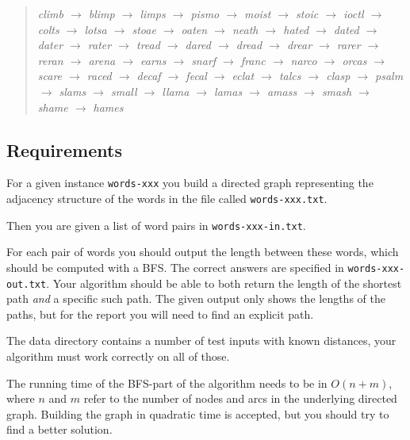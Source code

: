 \documentclass{tufte-handout}
\begin{document}
\begin{fullwidth}
\begin{quotation}\em
climb $\rightarrow$ blimp $\rightarrow$ limps $\rightarrow$ pismo $\rightarrow$ moist $\rightarrow$ stoic $\rightarrow$ ioctl $\rightarrow$ colts $\rightarrow$ lotsa $\rightarrow$ stoae $\rightarrow$ oaten $\rightarrow$ neath $\rightarrow$ hated $\rightarrow$ dated $\rightarrow$ dater $\rightarrow$ rater $\rightarrow$ tread $\rightarrow$ dared $\rightarrow$ dread $\rightarrow$ drear $\rightarrow$ rarer $\rightarrow$ reran $\rightarrow$ arena $\rightarrow$ earns $\rightarrow$ snarf $\rightarrow$ franc $\rightarrow$ narco $\rightarrow$ orcas $\rightarrow$ scare $\rightarrow$ raced $\rightarrow$ decaf $\rightarrow$ fecal $\rightarrow$ eclat $\rightarrow$ talcs $\rightarrow$ clasp $\rightarrow$ psalm $\rightarrow$ slams $\rightarrow$ small $\rightarrow$ llama $\rightarrow$ lamas $\rightarrow$ amass $\rightarrow$ smash $\rightarrow$ shame $\rightarrow$ hames
\end{quotation}
\end{fullwidth}

\newpage
\subsection{Requirements}

For a given instance {\tt words-xxx} you build a directed graph representing the adjacency structure of the words in the file called {\tt words-xxx.txt}. 

Then you are given a list of word pairs in {\tt words-xxx-in.txt}.

For each pair of words you should output the length between these words, which should be computed with a BFS. The correct answers are specified in {\tt words-xxx-out.txt}.
Your algorithm should be able to both return the length of the shortest path \emph{and} a specific such path. The given output only shows the lengths of the paths, but for the report you will need to find an explicit path.

The data directory contains a number of test inputs with known distances, your algorithm must work correctly on all of those.

The running time of the BFS-part of the algorithm needs to be in $O(n+m)$, where $n$ and $m$ refer to the number of nodes and arcs in the underlying directed graph.  
Building the graph in quadratic time is accepted, but you should try to find a better solution.
\end{document}
